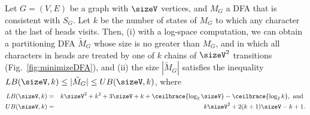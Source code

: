 %
\begin{lemma} \label{lemma:consistent DFA UB and LB, version 2}
Let $G=(V,E)$ be a graph with $\sizeV$ vertices, and $M_G$ a DFA that is consistent with $S_G$. 
Let $k$ be the number of states of $M_G$ to which any character at the last of heads visits. 
Then, (i) with a log-space computation, we can obtain a partitioning DFA $\tilde{M}_G$ whose size is no greater than $M_G$, and in which all characters in heads are treated by one of $k$ chains of $\sizeV^2$ transitions (Fig.~\ref{fig:minimizeDFA}), and (ii) the size $|\tilde{M}_G|$ satisfies the inequality $LB(\sizeV,k) \leq |\tilde{M}_G| \leq UB(\sizeV,k)$, where 
\begin{eqnarray*}
LB(\sizeV,k) %
		&=& k\sizeV^2 +k^2 +3\sizeV +k +\ceilbrace{\log_2{\sizeV}} - \ceilbrace{\log_2{k}}, \mbox{ and } \\
UB(\sizeV,k) %
		&=& k \sizeV^2 + 2(k+1)\sizeV -k +1.
\end{eqnarray*}
%
\end{lemma}
%
